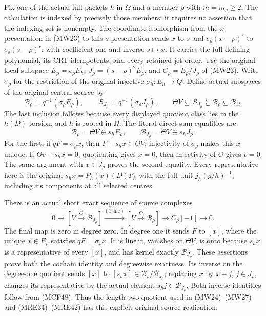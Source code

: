 Fix one of the actual full packets $h$ in $\Omega$ and a member
$\rho$ with $m=m_\rho\geq2$.  The calculation is indexed by precisely
those members; it requires no assertion that the indexing set is
nonempty.  The coordinate isomorphism from the $x$ presentation
in (MW23) to this $s$ presentation sends $x$ to $s$ and
$e_\rho(x-\rho)^r$ to $e_\rho(s-\rho)^r$, with coefficient one
and inverse $s\mapsto x$.  It carries the full defining
polynomial, its CRT idempotents, and every retained jet order.
Use the original local subspace $E_\rho=e_\rho E_h$,
$J_\rho=(s-\rho)^2E_\rho$, and $C_\rho=E_\rho/J_\rho$ of
(MW23).  Write $\sigma_\rho$ for the restriction of the original
injective $\sigma_h:E_h\to Q$.  Define actual subspaces of the
original central source by
\[
\mathscr B_\rho=q^{-1}(\sigma_\rho E_\rho),\qquad
\mathscr B_{J_\rho}=q^{-1}(\sigma_\rho J_\rho),\qquad
\Theta V\subseteq\mathscr B_{J_\rho}\subseteq\mathscr B_\rho
       \subseteq\mathscr B_\Omega .
\tag{MCF47}
\]
The last inclusion follows because every displayed quotient class
lies in the $h(D)$-torsion, and $h$ is rooted in $\Omega$.
The literal direct-sum equalities are
\[
\mathscr B_\rho=\Theta V\oplus s_h E_\rho,\qquad
\mathscr B_{J_\rho}=\Theta V\oplus s_h J_\rho.
\tag{MCF48}
\]
For the first, if $qF=\sigma_\rho x$, then $F-s_hx\in\Theta V$;
injectivity of $\sigma_\rho$ makes this $x$ unique.  If
$\Theta v+s_hx=0$, quotienting gives $x=0$, then injectivity of
$\Theta$ gives $v=0$.  The same argument with $x\in J_\rho$
proves the second equality.  Every representative here is the
original $s_hx=P_h(x)(D)F_h$ with the full unit
$j_h(g/h)^{-1}$, including its components at all selected centres.

There is an actual short exact sequence of source complexes
\[
0\longrightarrow[V\xrightarrow{\Theta}\mathscr B_{J_\rho}]
\xrightarrow{(1,\mathrm{inc})}
[V\xrightarrow{\Theta}\mathscr B_\rho]
\longrightarrow C_\rho[-1]\longrightarrow0.
\tag{MCF49}
\]
The final map is zero in degree zero.  In degree one it sends
$F$ to $[x]$, where the unique $x\in E_\rho$ satisfies
$qF=\sigma_\rho x$.  It is linear, vanishes on $\Theta V$,
is onto because $s_hx$ is a representative of every $[x]$,
and has kernel exactly $\mathscr B_{J_\rho}$.  These assertions
prove both the cochain identity and degreewise exactness.
Its inverse on the degree-one quotient sends $[x]$ to
$[s_hx]\in\mathscr B_\rho/\mathscr B_{J_\rho}$; replacing $x$
by $x+j$, $j\in J_\rho$, changes its representative by the
actual element $s_hj\in\mathscr B_{J_\rho}$.  Both inverse
identities follow from (MCF48).  Thus the length-two quotient
used in (MW24)--(MW27) and (MRE34)--(MRE42) has this explicit
original-source realization.

